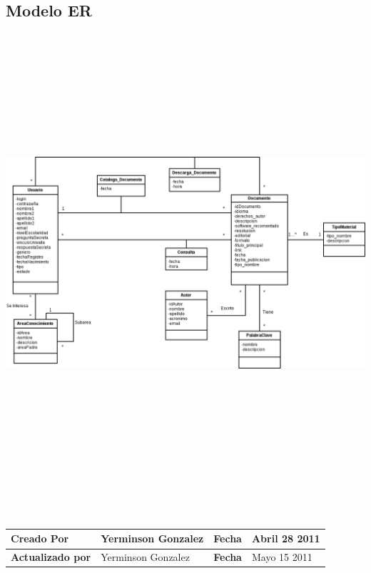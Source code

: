 \subsection{Modelo ER} 
	\begin{minipage}[c]{1\linewidth}
	    \centering
        \includegraphics[width=20cm, height=17cm, angle=90]{modeloDatos}
    \end{minipage}\\[.1cm]
       	
    \begin{tabular}{|p{3.5cm}|p{4.5cm}|p{2.5cm}|p{4.5cm}|}\hline
	{\bf Creado Por} & {Yerminson Gonzalez} & {\bf Fecha} & {Abril 28 2011}\\
	\hline
	{\bf Actualizado por} & {Yerminson Gonzalez} & {\bf Fecha} & {Mayo 15 2011}\\
	\hline
	\end{tabular}
        	
